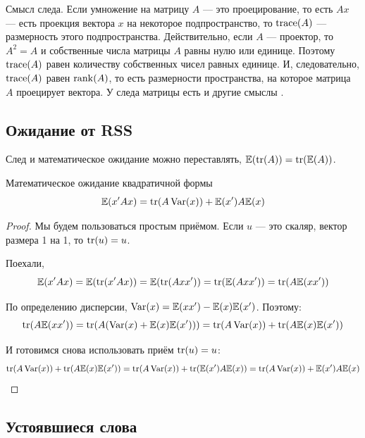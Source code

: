 \documentclass[12pt, a4paper]{article}
\begin{document}
Смысл следа. Если умножение на матрицу $A$ — это проецирование, то есть $Ax$ — есть проекция вектора $x$ на некоторое подпространство, то $\operatorname{trace}(A)$ — размерность этого подпространства. Действительно, если $A$ — проектор, то $A^2=A$ и собственные числа матрицы $A$ равны нулю или единице. Поэтому $\operatorname{trace}(A)$ равен количеству собственных чисел равных единице. И, следовательно, $\operatorname{trace}(A)$ равен $\operatorname{rank}(A)$, то есть размерности пространства, на которое матрица $A$ проецирует вектора. У следа матрицы есть и другие смыслы \autocite{mathoverflow0trace}.


\subsection{Ожидание от RSS}

\begin{theorem}
След и математическое ожидание можно переставлять, $\mathbb{E}(\operatorname{tr}(A))=\operatorname{tr}(\mathbb{E}(A))$.
\end{theorem}

\begin{theorem}
Математическое ожидание квадратичной формы
\begin{equation}
\mathbb{E}(x'Ax)=\operatorname{tr}(A\operatorname{Var}(x))+\mathbb{E}(x')A\mathbb{E}(x)
\end{equation}
\end{theorem}
\begin{proof}
Мы будем пользоваться простым приёмом. Если $u$ — это скаляр, вектор размера 1 на 1, то $\operatorname{tr}(u)=u$.

Поехали,
\begin{equation}
\mathbb{E}(x'Ax)=\mathbb{E}(\operatorname{tr}(x'Ax))=\mathbb{E}(\operatorname{tr}(Axx'))=\operatorname{tr}(\mathbb{E}(Axx'))=\operatorname{tr}(A\mathbb{E}(xx'))
\end{equation}

По определению дисперсии, $\operatorname{Var}(x)=\mathbb{E}(xx')-\mathbb{E}(x)\mathbb{E}(x')$. Поэтому:
\begin{equation}
\operatorname{tr}(A\mathbb{E}(xx'))=\operatorname{tr}(A(\operatorname{Var}(x)+\mathbb{E}(x)\mathbb{E}(x')))=\operatorname{tr}(A\operatorname{Var}(x))+\operatorname{tr}(A\mathbb{E}(x)\mathbb{E}(x'))
\end{equation}

И готовимся снова использовать приём $\operatorname{tr}(u)=u$:
\begin{equation}
\operatorname{tr}(A\operatorname{Var}(x))+\operatorname{tr}(A\mathbb{E}(x)\mathbb{E}(x'))=\operatorname{tr}(A\operatorname{Var}(x))+\operatorname{tr}(\mathbb{E}(x')A\mathbb{E}(x))=
\operatorname{tr}(A\operatorname{Var}(x))+\mathbb{E}(x')A\mathbb{E}(x)
\end{equation}

\end{proof}


\subsection{Устоявшиеся слова}
\end{document}
